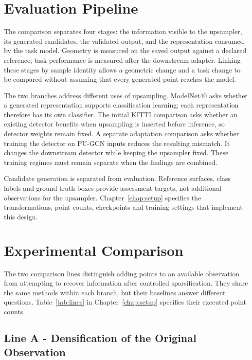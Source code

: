 \section{Evaluation Pipeline}
\label{sec:fc-3-2}

The comparison separates four stages: the information visible to the
upsampler, its generated candidates, the validated output, and the
representation consumed by the task model. Geometry is measured on the
saved output against a declared reference; task performance is measured
after the downstream adapter. Linking these stages by sample identity
allows a geometric change and a task change to be compared without
assuming that every generated point reaches the model.

The two branches address different uses of upsampling. ModelNet40 asks
whether a generated representation supports classification learning;
each representation therefore has its own classifier. The initial KITTI
comparison asks whether an existing detector benefits when upsampling is
inserted before inference, so detector weights remain fixed. A separate
adaptation comparison asks whether training the detector on PU-GCN inputs
reduces the resulting mismatch. It changes the downstream detector while
keeping the upsampler fixed. These training regimes must remain separate
when the findings are combined.

Candidate generation is separated from evaluation. Reference surfaces,
class labels and ground-truth boxes provide assessment targets, not
additional observations for the upsampler. Chapter~\ref{chap:setup}
specifies the transformations, point counts, checkpoints and training
settings that implement this design.

\section{Experimental Comparison}
\label{sec:fc-3-3}

The two comparison lines distinguish adding points to an available
observation from attempting to recover information after controlled
sparsification. They share the same methods within each branch, but
their baselines answer different questions. Table~\ref{tab:lines} in
Chapter~\ref{chap:setup} specifies their executed point counts.

\subsection{Line A - Densification of the Original Observation}
\label{sec:fc-3-3-1}

